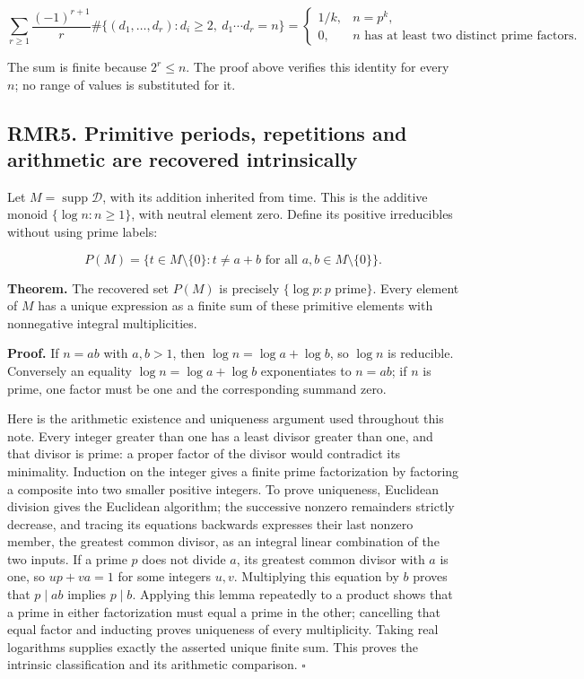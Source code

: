 \documentclass[
]{article}
\begin{document}
\[
\sum_{r\ge1}\frac{(-1)^{r+1}}r
\#\{(d_1,\ldots,d_r):d_i\ge2,\ d_1\cdots d_r=n\}
=\begin{cases}1/k,&n=p^k,\\0,&n\text{ has at least two distinct prime factors.}\end{cases}
\tag{RMR4.5}
\]

The sum is finite because \(2^r\le n\). The proof above verifies this
identity for every \(n\); no range of values is substituted for it.

\subsection{RMR5. Primitive periods, repetitions and arithmetic are
recovered
intrinsically}\label{rmr5.-primitive-periods-repetitions-and-arithmetic-are-recovered-intrinsically}

Let \(M=\operatorname{supp}\mathcal D\), with its addition inherited
from time. This is the additive monoid \(\{\log n:n\ge1\}\), with
neutral element zero. Define its positive irreducibles without using
prime labels:

\[
P(M)=\{t\in M\setminus\{0\}:t\ne a+b\text{ for all }a,b\in M\setminus\{0\}\}.
\tag{RMR5.1}
\]

\textbf{Theorem.} The recovered set \(P(M)\) is precisely
\(\{\log p:p\text{ prime}\}\). Every element of \(M\) has a unique
expression as a finite sum of these primitive elements with nonnegative
integral multiplicities.

\textbf{Proof.} If \(n=ab\) with \(a,b>1\), then
\(\log n=\log a+\log b\), so \(\log n\) is reducible. Conversely an
equality \(\log n=\log a+\log b\) exponentiates to \(n=ab\); if \(n\) is
prime, one factor must be one and the corresponding summand zero.

Here is the arithmetic existence and uniqueness argument used throughout
this note. Every integer greater than one has a least divisor greater
than one, and that divisor is prime: a proper factor of the divisor
would contradict its minimality. Induction on the integer gives a finite
prime factorization by factoring a composite into two smaller positive
integers. To prove uniqueness, Euclidean division gives the Euclidean
algorithm; the successive nonzero remainders strictly decrease, and
tracing its equations backwards expresses their last nonzero member, the
greatest common divisor, as an integral linear combination of the two
inputs. If a prime \(p\) does not divide \(a\), its greatest common
divisor with \(a\) is one, so \(up+va=1\) for some integers \(u,v\).
Multiplying this equation by \(b\) proves that \(p\mid ab\) implies
\(p\mid b\). Applying this lemma repeatedly to a product shows that a
prime in either factorization must equal a prime in the other;
cancelling that equal factor and inducting proves uniqueness of every
multiplicity. Taking real logarithms supplies exactly the asserted
unique finite sum. This proves the intrinsic classification and its
arithmetic comparison. \(\square\)
\end{document}

